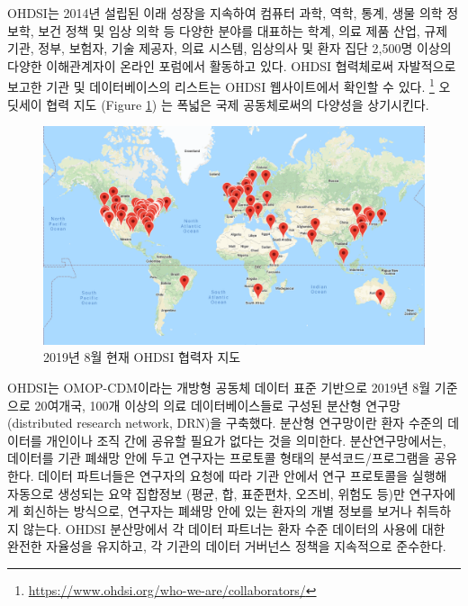 \documentclass[11pt]{book}
\let\rmarkdownfootnote\footnote%
\def\footnote{\protect\rmarkdownfootnote}
\theoremstyle{definition}
\theoremstyle{definition}
\theoremstyle{definition}
\theoremstyle{remark}
\begin{document}
OHDSI는 2014년 설립된 이래 성장을 지속하여 컴퓨터 과학, 역학, 통계, 생물
의학 정보학, 보건 정책 및 임상 의학 등 다양한 분야를 대표하는 학계, 의료
제품 산업, 규제 기관, 정부, 보험자, 기술 제공자, 의료 시스템, 임상의사
및 환자 집단 2,500명 이상의 다양한 이해관계자이 온라인 포럼에서 활동하고
있다. OHDSI 협력체로써 자발적으로 보고한 기관 및 데이터베이스의 리스트는
OHDSI 웹사이트에서 확인할 수 있다. \footnote{\url{https://www.ohdsi.org/who-we-are/collaborators/}}
오딧세이 협력 지도 (Figure \ref{fig:collaboratormap}) 는 폭넓은 국제
공동체로써의 다양성을 상기시킨다.

\begin{figure}

{\centering \includegraphics[width=1\linewidth]{images/OhdsiCommunity/mapOfCollaborators} 

}

\caption{2019년 8월 현재 OHDSI 협력자 지도}\label{fig:collaboratormap}
\end{figure}

OHDSI는 OMOP-CDM이라는 개방형 공동체 데이터 표준 기반으로 2019년 8월
기준으로 20여개국, 100개 이상의 의료 데이터베이스들로 구성된 분산형
연구망(distributed research network, DRN)을 구축했다. 분산형 연구망이란
환자 수준의 데이터를 개인이나 조직 간에 공유할 필요가 없다는 것을
의미한다. 분산연구망에서는, 데이터를 기관 폐쇄망 안에 두고 연구자는
프로토콜 형태의 분석코드/프로그램을 공유한다. 데이터 파트너들은 연구자의
요청에 따라 기관 안에서 연구 프로토콜을 실행해 자동으로 생성되는 요약
집합정보 (평균, 합, 표준편차, 오즈비, 위험도 등)만 연구자에게 회신하는
방식으로, 연구자는 폐쇄망 안에 있는 환자의 개별 정보를 보거나 취득하지
않는다. OHDSI 분산망에서 각 데이터 파트너는 환자 수준 데이터의 사용에
대한 완전한 자율성을 유지하고, 각 기관의 데이터 거버넌스 정책을
지속적으로 준수한다.
\end{document}
